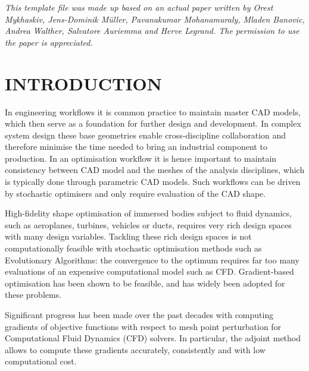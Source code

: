 \documentclass[9pt,academicons]{article}
\begin{document}
%




\noindent
\textit{This template file was made up based on an actual paper written by Orest Mykhaskiv, Jens-Dominik M\"uller, Pavanakumar Mohanamuraly, Mladen Banovic, Andrea Walther, Salvatore Auriemma and Herve Legrand. The permission to use the paper is appreciated.}


\section{INTRODUCTION}
In engineering workflows it is common practice to maintain master CAD models, which then serve as a foundation for further design and development. In complex system design these base geometries enable cross-discipline collaboration and therefore minimise the time needed to bring an industrial component to 
production. In an optimisation workflow it is hence important to maintain consistency between
CAD model and the meshes of the analysis disciplines, which is typically done
through parametric CAD models. Such workflows can be driven by stochastic optimisers
and only require evaluation of the CAD shape. 

High-fidelity shape optimisation of immersed bodies subject to fluid dynamics, such as 
aeroplanes, turbines, vehicles or ducts, requires very rich design spaces with many
design variables. Tackling these rich design spaces is not computationally 
feasible with stochastic optimisation methods such as Evolutionary Algorithms: the convergence to the optimum requires far too many evaluations of an expensive computational model such as CFD. 
Gradient-based optimisation has been shown to be feasible, and has widely been
adopted for these problems.


Significant progress has been made over the past decades with computing
gradients of objective functions with respect to mesh point perturbation 
for Computational Fluid Dynamics (CFD) solvers. In particular, the adjoint method
\cite{pironneau, jameson88aerodynamic, econom15su2,stueck12fresco,jones11mgopt}
allows to compute these gradients accurately, consistently and with low computational cost.
\end{document}
